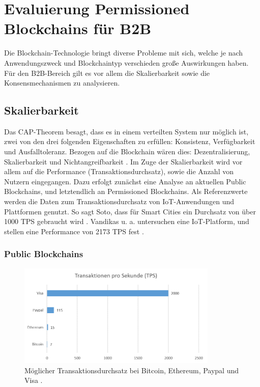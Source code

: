 \chapter{Evaluierung Permissioned Blockchains für B2B}
\label{cha:b2b-eval}

Die Blockchain-Technologie bringt diverse Probleme mit sich, welche je nach Anwendungszweck und Blockchaintyp verschieden große Auswirkungen haben. Für den B2B-Bereich gilt es vor allem die Skalierbarkeit sowie die Konsensmechanismen zu analysieren.

\section{Skalierbarkeit}
\label{sec:scalability-eval}
Das CAP-Theorem besagt, dass es in einem verteilten System nur möglich ist, zwei von den drei folgenden Eigenschaften zu erfüllen: Konsistenz, Verfügbarkeit und Ausfalltoleranz. Bezogen auf die Blockchain wären dies: Dezentralisierung, Skalierbarkeit und Nichtangreifbarkeit \cite{SchererPerformanceScalabilityBlockchain2017}. Im Zuge der Skalierbarkeit wird vor allem auf die Performance (Transaktionsdurchsatz), sowie die Anzahl von Nutzern  eingegangen. Dazu erfolgt zunächst eine Analyse an aktuellen Public Blockchains, und letztendlich an Permissioned Blockchains. Als Referenzwerte werden die Daten zum Transaktionsdurchsatz von IoT-Anwendungen und Plattformen genutzt. So sagt Soto, dass für Smart Cities ein Durchsatz von über 1000 TPS gebraucht wird \cite{AraujoSotoPerformanceevaluationscalable2017}. Vandikas u. a. untersuchen eine IoT-Platform, und stellen eine Performance von 2173 TPS fest \cite{VandikasPerformanceEvaluationIoT2014a}. 

\subsection{Public Blockchains}
\begin{figure}[!htbp]
  \centering
    \includegraphics[width=0.85\textwidth,angle=0]{images/tps-comparison}
     \caption{Möglicher Transaktionsdurchsatz bei Bitcoin, Ethereum, Paypal und Visa \cite{BitcoinTeamScalabilityBitcoinWiki}.}
    \label{fig:tps-comparison}
\end{figure}

